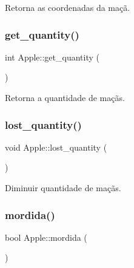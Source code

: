 Retorna as coordenadas da maçã. 

\mbox{\label{classApple_afc60cf395df30061e4776f56dcc7d24f}} 
\subsubsection{\texorpdfstring{get\+\_\+quantity()}{get\_quantity()}}
{\footnotesize\ttfamily int Apple\+::get\+\_\+quantity (\begin{DoxyParamCaption}{ }\end{DoxyParamCaption})\hspace{0.3cm}{\ttfamily [inline]}}



Retorna a quantidade de maçãs. 

\mbox{\label{classApple_ac444e616a32d06b163cd3c4853845560}} 
\subsubsection{\texorpdfstring{lost\+\_\+quantity()}{lost\_quantity()}}
{\footnotesize\ttfamily void Apple\+::lost\+\_\+quantity (\begin{DoxyParamCaption}{ }\end{DoxyParamCaption})\hspace{0.3cm}{\ttfamily [inline]}}



Diminuir quantidade de maçãs. 

\mbox{\label{classApple_a26996683f71826895b059105e63a9dfe}} 
\subsubsection{\texorpdfstring{mordida()}{mordida()}}
{\footnotesize\ttfamily bool Apple\+::mordida (\begin{DoxyParamCaption}{ }\end{DoxyParamCaption})\hspace{0.3cm}{\ttfamily [inline]}}



